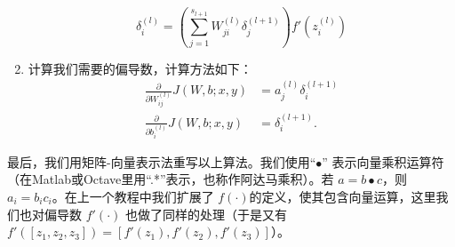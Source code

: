 \begin{enumerate}
\[\delta^{(l)}_i = \left( \sum_{j=1}^{s_{l+1}} W^{(l)}_{ji} \delta^{(l+1)}_j \right) f'(z^{(l)}_i)\]
\item
计算我们需要的偏导数，计算方法如下：
\begin{align}
\frac{\partial}{\partial W_{ij}^{(l)}} J(W,b; x, y) &= a^{(l)}_j \delta_i^{(l+1)} \nonumber \\
\frac{\partial}{\partial b_{i}^{(l)}} J(W,b; x, y) &= \delta_i^{(l+1)}.
\nonumber \end{align}
\end{enumerate}

最后，我们用矩阵-向量表示法重写以上算法。我们使用“$ \bullet$” 表示向量乘积运算符（在Matlab或Octave里用“.*”表示，也称作阿达马乘积）。若 $ a = b \bullet c$，则 $ a_i = b_ic_i$。在上一个教程中我们扩展了 $ f(\cdot) $的定义，使其包含向量运算，这里我们也对偏导数 $ f'(\cdot)$ 也做了同样的处理（于是又有  $ f'([z_1, z_2, z_3]) = [f'(z_1), f'(z_2), f'(z_3)] $）。

